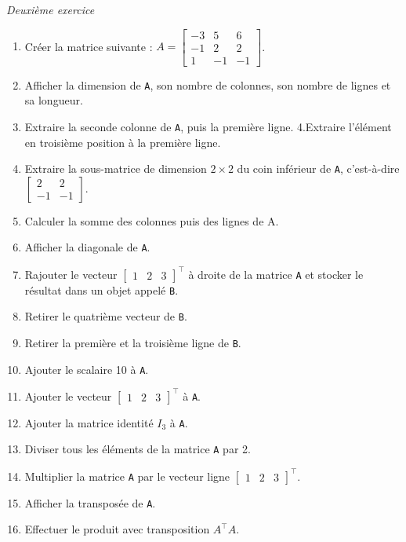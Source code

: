 \documentclass[
  12pt,
]{book}
\makeatletter
\providecommand{\tightlist}{%
  \setlength{\itemsep}{0pt}\setlength{\parskip}{0pt}}
\numberwithin{equation}{section}
\numberwithin{countremarque}{section}
\newenvironment{exframe}{%
 \def\at@end@of@exframe{}%
 \ifinner\ifhmode%
  \def\at@end@of@exframe{\end{minipage}}%
  \begin{minipage}{\columnwidth}%
 \fi\fi%
 \def\FrameCommand##1{\hskip\@totalleftmargin \hskip-\fboxsep
 \colorbox{shadecolorex}{##1}\hskip-\fboxsep
     \hskip-\linewidth \hskip-\@totalleftmargin \hskip\columnwidth}%
 \MakeFramed {\advance\hsize-\width
   \@totalleftmargin\z@ \linewidth\hsize
   \@setminipage}}%
 {\par\unskip\endMakeFramed%
 \at@end@of@exframe}
\makeatother
\begin{document}
\begin{exframe}
\emph{Deuxième exercice}

\begin{enumerate}
\def\labelenumi{\arabic{enumi}.}
\tightlist
\item
  Créer la matrice suivante : \(A = \begin{bmatrix} -3 & 5 & 6 \\ -1 & 2 & 2 \\ 1 & -1 & -1 \end{bmatrix}\).
\item
  Afficher la dimension de \texttt{A}, son nombre de colonnes, son nombre de lignes et sa longueur.
\item
  Extraire la seconde colonne de \texttt{A}, puis la première ligne.
  4.Extraire l'élément en troisième position à la première ligne.
\item
  Extraire la sous-matrice de dimension \(2\times 2\) du coin inférieur de \texttt{A}, c'est-à-dire \(\begin{bmatrix} 2 & 2 \\ -1 & -1 \end{bmatrix}\).
\item
  Calculer la somme des colonnes puis des lignes de A.
\item
  Afficher la diagonale de \texttt{A}.
\item
  Rajouter le vecteur \(\begin{bmatrix} 1 & 2 & 3\end{bmatrix}^\top\) à droite de la matrice \texttt{A} et stocker le résultat dans un objet appelé \texttt{B}.
\item
  Retirer le quatrième vecteur de \texttt{B}.
\item
  Retirer la première et la troisième ligne de \texttt{B}.
\item
  Ajouter le scalaire 10 à \texttt{A}.
\item
  Ajouter le vecteur \(\begin{bmatrix} 1 & 2 & 3\end{bmatrix}^\top\) à \texttt{A}.
\item
  Ajouter la matrice identité \(I_3\) à \texttt{A}.
\item
  Diviser tous les éléments de la matrice \texttt{A} par 2.
\item
  Multiplier la matrice \texttt{A} par le vecteur ligne \(\begin{bmatrix} 1 & 2 & 3\end{bmatrix}^\top\).
\item
  Afficher la transposée de \texttt{A}.
\item
  Effectuer le produit avec transposition \(A^\top A\).
\end{enumerate}
\end{exframe}
\end{document}

